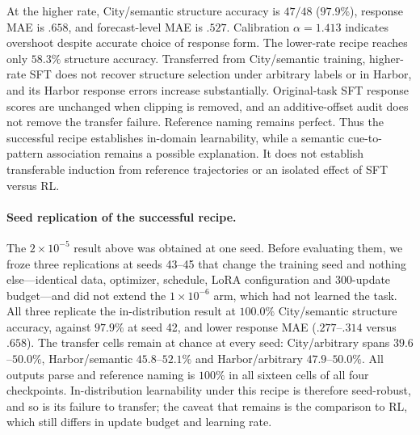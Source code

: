 At the higher rate, City/semantic structure accuracy is $47/48$ ($97.9\%$),
response MAE is $.658$, and forecast-level MAE is $.527$. Calibration
$\alpha=1.413$ indicates overshoot despite accurate choice of response form.
The lower-rate recipe reaches only $58.3\%$ structure accuracy. Transferred
from City/semantic training, higher-rate SFT does not recover structure
selection under arbitrary labels or in Harbor, and its Harbor response errors
increase substantially. Original-task SFT response scores are unchanged when
clipping is removed, and an additive-offset audit does not remove the transfer
failure. Reference naming remains perfect. Thus the successful recipe
establishes in-domain learnability, while a semantic cue-to-pattern
association remains a possible explanation. It does not establish transferable
induction from reference trajectories or an isolated effect of SFT versus RL.

\paragraph{Seed replication of the successful recipe.}
The $2\times10^{-5}$ result above was obtained at one seed. Before evaluating
them, we froze three replications at seeds 43--45 that change the training seed
and nothing else---identical data, optimizer, schedule, LoRA configuration and
300-update budget---and did not extend the $1\times10^{-6}$ arm, which had not
learned the task. All three replicate the in-distribution result at $100.0\%$
City/semantic structure accuracy, against $97.9\%$ at seed 42, and lower
response MAE ($.277$--$.314$ versus $.658$). The transfer cells remain at
chance at every seed: City/arbitrary spans $39.6$--$50.0\%$, Harbor/semantic
$45.8$--$52.1\%$ and Harbor/arbitrary $47.9$--$50.0\%$. All outputs parse and
reference naming is $100\%$ in all sixteen cells of all four checkpoints.
In-distribution learnability under this recipe is therefore seed-robust, and so
is its failure to transfer; the caveat that remains is the comparison to RL,
which still differs in update budget and learning rate.

\begin{table}[htbp]
\centering\small
\setlength{\tabcolsep}{4pt}

\caption{\textbf{The supervised in-distribution result is seed-robust, and so
is its transfer failure.} The $2\times10^{-5}$ recipe at four training seeds,
evaluated on the unchanged 768-prompt component diagnostic. Only the seed
differs. Response MAE and Name are the City/semantic cell.}
\label{tab:exp3-learnability-seeds}
\end{table}

